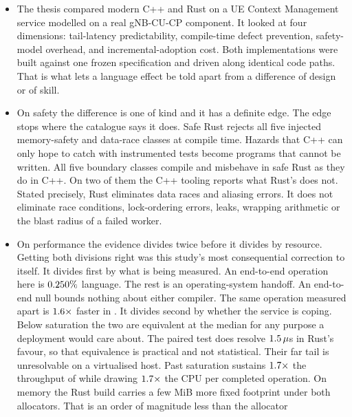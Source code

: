 \documentclass[english,twoside,openright,a4paper,censored,csm,software-track-2020]{HYthesisML}
\begin{document}
\begin{itemize}
  \item The thesis compared modern C++ and Rust on a UE Context Management service modelled on a
        real gNB-CU-CP component. It looked at four dimensions: tail-latency predictability,
        compile-time defect prevention, safety-model overhead, and incremental-adoption cost.
        Both implementations were built against one frozen specification and driven along identical
        code paths. That is what lets a language effect be told apart from a difference of design
        or of skill.
  \item On safety the difference is one of kind and it has a definite edge. The edge stops where
        the catalogue says it does. Safe Rust rejects all five injected memory-safety and
        data-race classes at compile time. Hazards that C++ can only hope to catch with
        instrumented tests become programs that cannot be written. All five boundary classes
        compile and misbehave in safe Rust as they do in C++. On two of them the C++ tooling
        reports what Rust's does not. Stated precisely, Rust eliminates data races and aliasing
        errors. It does not eliminate race conditions, lock-ordering errors, leaks, wrapping
        arithmetic or the blast radius of a failed worker.
  \item On performance the evidence divides twice before it divides by resource. Getting both
        divisions right was this study's most consequential correction to itself. It divides first
        by what is being measured. An end-to-end operation here is $0.250\%$
        language. The rest is an operating-system handoff. An end-to-end null bounds nothing about
        either compiler. The same operation measured apart is $1.6\times$ faster in
        \BudgetCoreFaster{}. It divides second by whether the service is coping. Below saturation
        the two are equivalent at the median for any purpose a deployment would care about. The
        paired test does resolve $1.5\,\mu$s in Rust's favour, so that equivalence is
        practical and not statistical. Their far tail is unresolvable on a virtualised
        host. Past saturation \OverloadSustainedFaster{} sustains $1.7\times$ the
        throughput of \OverloadSustainedSlower{} while drawing $1.7\times$
        the CPU per completed operation. On memory the Rust build carries a few MiB more fixed
        footprint under both allocators. That is an order of magnitude less than the allocator

\end{itemize}
\end{document}
